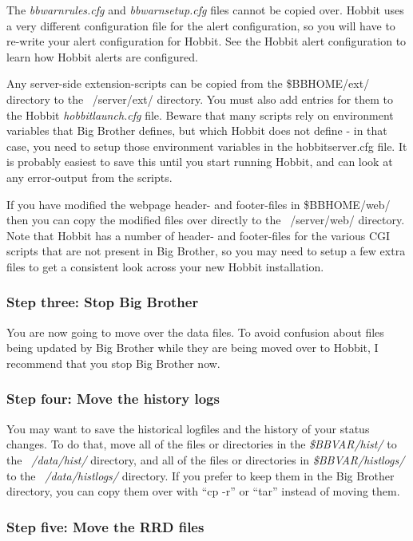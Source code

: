  The \emph{bbwarnrules.cfg}
 and \emph{bbwarnsetup.cfg}
 files cannot be copied over. Hobbit uses a very different configuration file for the alert configuration, so you will have to re-write your alert configuration for Hobbit. See the Hobbit alert configuration to learn how Hobbit alerts are configured.


 Any server-side extension-scripts can be copied from the \$BBHOME/ext/ directory to the ~/server/ext/ directory. You must also add entries for them to the Hobbit \emph{hobbitlaunch.cfg}
 file. Beware that many scripts rely on environment variables that Big Brother defines, but which Hobbit does not define - in that case, you need to setup those environment variables in the hobbitserver.cfg file. It is probably easiest to save this until you start running Hobbit, and can look at any error-output from the scripts.


 If you have modified the webpage header- and footer-files in \$BBHOME/web/ then you can copy the modified files over directly to the ~/server/web/ directory. Note that Hobbit has a number of header- and footer-files for the various CGI scripts that are not present in Big Brother, so you may need to setup a few extra files to get a consistent look across your new Hobbit installation.
\subsubsection{Step three: Stop Big Brother}


 You are now going to move over the data files. To avoid confusion about files being updated by Big Brother while they are being moved over to Hobbit, I recommend that you stop Big Brother now.
\subsubsection{Step four: Move the history logs}


 You may want to save the historical logfiles and the history of your status changes. To do that, move all of the files or directories in the \emph{\$BBVAR/hist/}
 to the \emph{~/data/hist/}
 directory, and all of the files or directories in \emph{\$BBVAR/histlogs/}
 to the \emph{~/data/histlogs/}
 directory. If you prefer to keep them in the Big Brother directory, you can copy them over with ``cp -r'' or ``tar'' instead of moving them.
\subsubsection{Step five: Move the RRD files}


